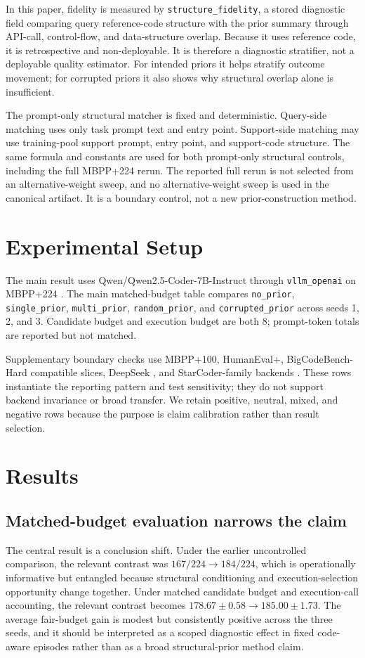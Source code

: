 \documentclass{article}
\newcommand{\code}[1]{\texttt{#1}}
\begin{document}
In this paper, fidelity is measured by \code{structure\_fidelity}, a stored diagnostic field comparing query reference-code structure with the prior summary through API-call, control-flow, and data-structure overlap. Because it uses reference code, it is retrospective and non-deployable. It is therefore a diagnostic stratifier, not a deployable quality estimator. For intended priors it helps stratify outcome movement; for corrupted priors it also shows why structural overlap alone is insufficient.

The prompt-only structural matcher is fixed and deterministic. Query-side matching uses only task prompt text and entry point. Support-side matching may use training-pool support prompt, entry point, and support-code structure. The same formula and constants are used for both prompt-only structural controls, including the full MBPP+224 rerun. The reported full rerun is not selected from an alternative-weight sweep, and no alternative-weight sweep is used in the canonical artifact. It is a boundary control, not a new prior-construction method.

\section{Experimental Setup}
The main result uses Qwen/Qwen2.5-Coder-7B-Instruct through \code{vllm\_openai} on MBPP+224 \citep{hui2024qwen}. The main matched-budget table compares \code{no\_prior}, \code{single\_prior}, \code{multi\_prior}, \code{random\_prior}, and \code{corrupted\_prior} across seeds 1, 2, and 3. Candidate budget and execution budget are both 8; prompt-token totals are reported but not matched.

Supplementary boundary checks use MBPP+100, HumanEval+, BigCodeBench-Hard compatible slices, DeepSeek \citep{guo2024deepseek}, and StarCoder-family backends \citep{li2023starcoder}. These rows instantiate the reporting pattern and test sensitivity; they do not support backend invariance or broad transfer. We retain positive, neutral, mixed, and negative rows because the purpose is claim calibration rather than result selection.

\section{Results}
\subsection{Matched-budget evaluation narrows the claim}
The central result is a conclusion shift. Under the earlier uncontrolled comparison, the relevant contrast was $167/224 \rightarrow 184/224$, which is operationally informative but entangled because structural conditioning and execution-selection opportunity change together. Under matched candidate budget and execution-call accounting, the relevant contrast becomes $178.67 \pm 0.58 \rightarrow 185.00 \pm 1.73$. The average fair-budget gain is modest but consistently positive across the three seeds, and it should be interpreted as a scoped diagnostic effect in fixed code-aware episodes rather than as a broad structural-prior method claim.
\end{document}
